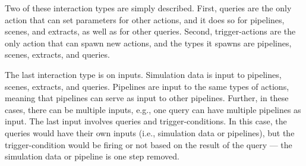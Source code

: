 Two of these interaction types are simply described.  
%
First, queries are the only action that can set parameters for other actions, and it does so for
pipelines, scenes, and extracts, as well as for other queries.
%
Second, trigger-actions are the only action that can spawn new actions, and the types it spawns are
pipelines, scenes, extracts, and queries.
%

The last interaction type is on inputs.
%
Simulation data is input to pipelines, scenes, extracts, and queries.
%
Pipelines are input to the same types of actions, meaning that pipelines can serve as input
to other pipelines.
%
Further, in these cases, there can be multiple inputs, e.g., one query can have multiple
pipelines as input.
%
The last input involves queries and trigger-conditions. 
%
In this case, the queries would have their own inputs (i.e., simulation data or pipelines), 
but the trigger-condition would be firing or not based on the result of the query ---
the simulation data or pipeline is one step removed.
